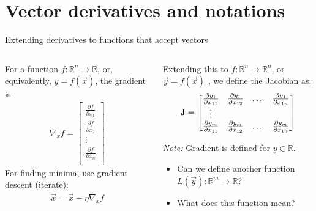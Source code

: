 \section{Vector derivatives and notations}
\begin{frame}{Extending derivatives to  functions that accept vectors}
	\begin{columns}[T]
		\begin{column}{.5\textwidth}
		For a function $f:\mathbb{R}^n \rightarrow \mathbb{R}$, 
			or, equivalently, $y=f(\vec{x})$, the gradient is:
			\begin{align}
			\nabla_x f = \begin{bmatrix}
			\frac{\partial f}{\partial x_1} \\
			\frac{\partial f}{\partial x_2} \\
			\vdots \\
			\frac{\partial f}{\partial x_n} \\
			\end{bmatrix}
			\end{align}
			For finding minima, use gradient descent (iterate):
			\begin{align}\label{eq:gradient.desc}
			\vec{x} =  \vec{x} - \eta \nabla_x f 
			\end{align}
		\end{column}
		\begin{column}{.5\textwidth}
			Extending this to  $f:\mathbb{R}^n \rightarrow \mathbb{R}^n$, 
			or $\vec{y}=f(\vec{x})$
			, we define the Jacobian as:
			\begin{align}
			{\bf J} = \begin{bmatrix}
			\frac{\partial y_1}{\partial x_{11}} & \frac{\partial y_1}{\partial x_{12}} & \dots & \frac{\partial y_1}{\partial x_{1n}}\\
			\vdots &  & & \\
			\frac{\partial y_m}{\partial x_{11}} & \frac{\partial y_m}{\partial x_{12}} & \dots & \frac{\partial y_m}{\partial x_{1n}} \\
			\end{bmatrix}
			\end{align}
			{\tiny
			{\it Note:}  Gradient is defined for $y\in \mathbb{R}$.
			\begin{itemize}
				\item Can we  define another function 	$L(\vec{y}):\mathbb{R}^m\rightarrow \mathbb{R}$?
				\item What does this function mean?
			\end{itemize} 
			}
		\end{column}
	\end{columns}
\end{frame}